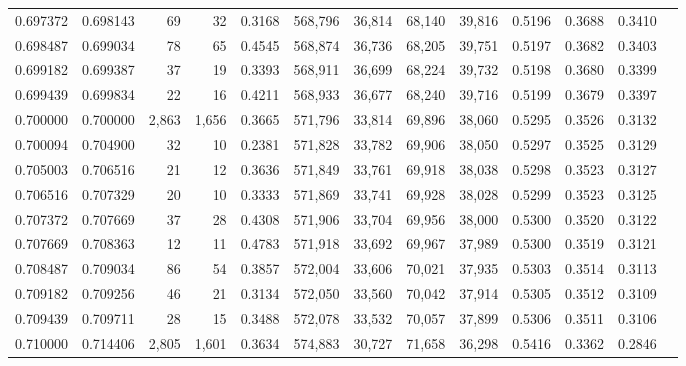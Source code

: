 \begin{tabular}{rrrrrrrrrrrrr}
0.697372 & 0.698143 &     69 &    32 &                                     0.3168 & 568,796 &  36,814 &  68,140 &  39,816 & 0.5196 & 0.3688 & 0.3410 \\
0.698487 & 0.699034 &     78 &    65 &                                     0.4545 & 568,874 &  36,736 &  68,205 &  39,751 & 0.5197 & 0.3682 & 0.3403 \\
0.699182 & 0.699387 &     37 &    19 &                                     0.3393 & 568,911 &  36,699 &  68,224 &  39,732 & 0.5198 & 0.3680 & 0.3399 \\
0.699439 & 0.699834 &     22 &    16 &                                     0.4211 & 568,933 &  36,677 &  68,240 &  39,716 & 0.5199 & 0.3679 & 0.3397 \\
0.700000 & 0.700000 &  2,863 & 1,656 &                                     0.3665 & 571,796 &  33,814 &  69,896 &  38,060 & 0.5295 & 0.3526 & 0.3132 \\
0.700094 & 0.704900 &     32 &    10 &                                     0.2381 & 571,828 &  33,782 &  69,906 &  38,050 & 0.5297 & 0.3525 & 0.3129 \\
0.705003 & 0.706516 &     21 &    12 &                                     0.3636 & 571,849 &  33,761 &  69,918 &  38,038 & 0.5298 & 0.3523 & 0.3127 \\
0.706516 & 0.707329 &     20 &    10 &                                     0.3333 & 571,869 &  33,741 &  69,928 &  38,028 & 0.5299 & 0.3523 & 0.3125 \\
0.707372 & 0.707669 &     37 &    28 &                                     0.4308 & 571,906 &  33,704 &  69,956 &  38,000 & 0.5300 & 0.3520 & 0.3122 \\
0.707669 & 0.708363 &     12 &    11 &                                     0.4783 & 571,918 &  33,692 &  69,967 &  37,989 & 0.5300 & 0.3519 & 0.3121 \\
0.708487 & 0.709034 &     86 &    54 &                                     0.3857 & 572,004 &  33,606 &  70,021 &  37,935 & 0.5303 & 0.3514 & 0.3113 \\
0.709182 & 0.709256 &     46 &    21 &                                     0.3134 & 572,050 &  33,560 &  70,042 &  37,914 & 0.5305 & 0.3512 & 0.3109 \\
0.709439 & 0.709711 &     28 &    15 &                                     0.3488 & 572,078 &  33,532 &  70,057 &  37,899 & 0.5306 & 0.3511 & 0.3106 \\
0.710000 & 0.714406 &  2,805 & 1,601 &                                     0.3634 & 574,883 &  30,727 &  71,658 &  36,298 & 0.5416 & 0.3362 & 0.2846 \\

\end{tabular}
